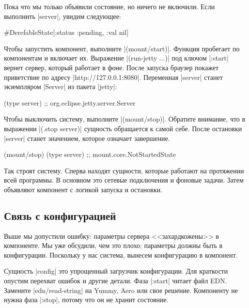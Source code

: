 Пока что мы только объявили состояние, но ничего не включили. Если выполнить
\spverb|server|, увидим следующее:

\begin{english}
  \begin{clojure}
#DerefableState[{:status :pending, :val nil}]
  \end{clojure}
\end{english}

Чтобы запустить компонент, выполните \spverb|(mount/start)|. Функция пробегает
по компонентам и включает их. Выражение \spverb|(run-jetty ...)| под ключом
\spverb|:start| вернет сервер, который работает в фоне. После запуска браузер
покажет приветствие по адресу \spverb|http://127.0.0.1:8080|. Переменная
\spverb|server| станет экземпляром \spverb|Server| из пакета \spverb|jetty|:

\begin{english}
  \begin{clojure}
(type server)
;; org.eclipse.jetty.server.Server
  \end{clojure}
\end{english}

Чтобы выключить систему, выполните \spverb|(mount/stop)|. Обратите внимание, что
в выражении \spverb|(.stop server)| сущность обращается к самой себе. После
остановки \spverb|server| станет значением, которое означает завершение.

\begin{english}
  \begin{clojure}
(mount/stop)
(type server)
;; mount.core.NotStartedState
  \end{clojure}
\end{english}

Так строят систему. Сперва находят сущности, которые работают на протяжении всей
программы. В основном это сетевые подключения и фоновые задачи. Затем объявляют
компонент с логикой запуска и остановки.

\subsection{Связь с конфигурацией}

Выше мы допустили ошибку: параметры сервера <<захардкожены>> в компоненте. Мы
уже обсудили, чем это плохо; параметры должны быть в конфигурации. Поскольку у
нас система, вынесем конфигурацию в компонент.


Сущность \spverb|config| это упрощенный загрузчик конфигурации. Для краткости
опустим перехват ошибок и другие детали. Фаза \spverb|:start| читает файл
EDN. Замените \spverb|edn/read-string| на Yummy, Aero или свое
решение. Компоненту не нужна фаза \spverb|:stop|, потому что он не хранит
состояние.


